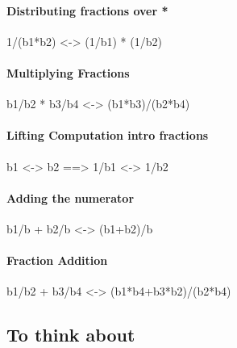 \documentclass[preprint]{sigplanconf}
\begin{document}
\paragraph*{Distributing fractions over {{*}} }

{{1/(b1*b2) <-> (1/b1) * (1/b2)}}

\paragraph*{Multiplying Fractions}

{{b1/b2 * b3/b4 <-> (b1*b3)/(b2*b4)}}

\paragraph*{Lifting Computation intro fractions}

{{b1 <-> b2 ==> 1/b1 <-> 1/b2}}

\paragraph*{Adding the numerator}

{{b1/b + b2/b <-> (b1+b2)/b}}

\paragraph*{Fraction Addition}

{{b1/b2 + b3/b4 <-> (b1*b4+b3*b2)/(b2*b4) }}


\subsection{To think about}
\end{document}
